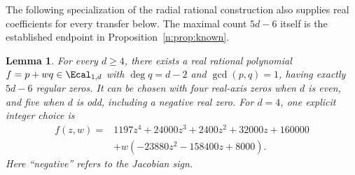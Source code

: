 \documentclass[UTF8,11pt]{ctexart}
\newtheorem{lem}[thm]{Lemma}
\theoremstyle{definition}
\numberwithin{equation}{section}
\begin{document}
The following specialization of the radial rational construction
also supplies real coefficients for every transfer below.
The maximal count $5d-6$ itself is the established endpoint
in Proposition~\ref{n:prop:known}.

\begin{lem}\label{v42:lem:realseeds}
For every $d\ge4$, there exists a real rational polynomial
$f=p+wq\in\Ecal_{1,d}$ with $\deg q=d-2$ and
$\gcd(p,q)=1$, having exactly $5d-6$ regular zeros.
It can be chosen with four real-axis zeros when $d$ is even,
and five when $d$ is odd, including a negative real zero.
For $d=4$, one explicit integer choice is
\begin{equation}\label{v42:eq:fourteenseed}
 \begin{split}
 f(z,w)={}&1197z^4+24000z^3+2400z^2+32000z+160000\\
         &+w(-23880z^2-158400z+8000).
 \end{split}
\end{equation}
Here ``negative'' refers to the Jacobian sign.
\end{lem}
\end{document}
